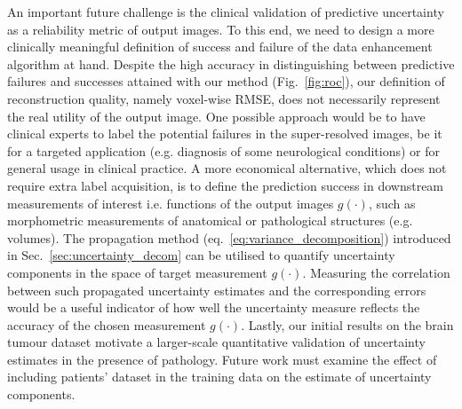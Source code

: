 An important future challenge is the clinical validation of predictive uncertainty as a reliability metric of output images. To this end, we need to design a more clinically meaningful definition of success and failure of the data enhancement algorithm at hand. Despite the high accuracy in distinguishing between predictive failures and successes attained with our method (Fig.~\ref{fig:roc}),  our definition of reconstruction quality, namely voxel-wise RMSE, does not necessarily represent the real utility of the output image. One possible approach would be to have clinical experts to label the potential failures in the super-resolved images, be it for a targeted application (e.g. diagnosis of some neurological conditions) or for general usage in clinical practice. A more economical alternative, which does not require extra label acquisition, is to define the prediction success in downstream measurements of interest i.e. functions of the output images $g(\cdot)$, such as morphometric measurements of anatomical or pathological structures (e.g. volumes). The propagation method (eq.~\eqref{eq:variance_decomposition}) introduced in Sec.~\ref{sec:uncertainty_decom} can be utilised to quantify uncertainty components in the space of target measurement  $g(\cdot)$. Measuring the correlation between such propagated uncertainty estimates and the corresponding errors would be a useful indicator of how well the uncertainty measure reflects the accuracy of the chosen measurement $g(\cdot)$. Lastly, our initial results on the brain tumour dataset motivate a larger-scale quantitative validation of uncertainty estimates in the presence of pathology. Future work must examine the effect of including patients' dataset in the training data on the estimate of uncertainty components. 

